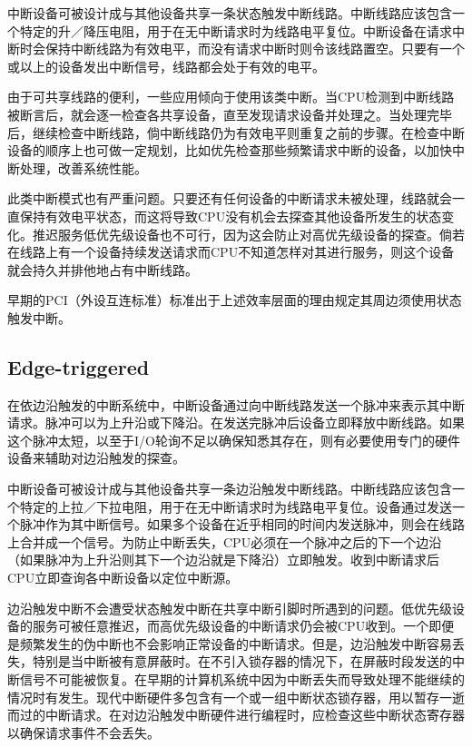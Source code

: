 中断设备可被设计成与其他设备共享一条状态触发中断线路。中断线路应该包含一个特定的升／降压电阻，用于在无中断请求时为线路电平复位。中断设备在请求中断时会保持中断线路为有效电平，而没有请求中断时则令该线路置空。只要有一个或以上的设备发出中断信号，线路都会处于有效的电平。

由于可共享线路的便利，一些应用倾向于使用该类中断。当CPU检测到中断线路被断言后，就会逐一检查各共享设备，直至发现请求设备并处理之。当处理完毕后，继续检查中断线路，倘中断线路仍为有效电平则重复之前的步骤。在检查中断设备的顺序上也可做一定规划，比如优先检查那些频繁请求中断的设备，以加快中断处理，改善系统性能。

此类中断模式也有严重问题。只要还有任何设备的中断请求未被处理，线路就会一直保持有效电平状态，而这将导致CPU没有机会去探查其他设备所发生的状态变化。推迟服务低优先级设备也不可行，因为这会防止对高优先级设备的探查。倘若在线路上有一个设备持续发送请求而CPU不知道怎样对其进行服务，则这个设备就会持久并排他地占有中断线路。

早期的PCI（外设互连标准）标准出于上述效率层面的理由规定其周边须使用状态触发中断。

\subsection{Edge-triggered}

在依边沿触发的中断系统中，中断设备通过向中断线路发送一个脉冲来表示其中断请求。脉冲可以为上升沿或下降沿。在发送完脉冲后设备立即释放中断线路。如果这个脉冲太短，以至于I/O轮询不足以确保知悉其存在，则有必要使用专门的硬件设备来辅助对边沿触发的探查。

中断设备可被设计成与其他设备共享一条边沿触发中断线路。中断线路应该包含一个特定的上拉／下拉电阻，用于在无中断请求时为线路电平复位。设备通过发送一个脉冲作为其中断信号。如果多个设备在近乎相同的时间内发送脉冲，则会在线路上合并成一个信号。为防止中断丢失，CPU必须在一个脉冲之后的下一个边沿（如果脉冲为上升沿则其下一个边沿就是下降沿）立即触发。收到中断请求后CPU立即查询各中断设备以定位中断源。

边沿触发中断不会遭受状态触发中断在共享中断引脚时所遇到的问题。低优先级设备的服务可被任意推迟，而高优先级设备的中断请求仍会被CPU收到。一个即便是频繁发生的伪中断也不会影响正常设备的中断请求。但是，边沿触发中断容易丢失，特别是当中断被有意屏蔽时。在不引入锁存器的情况下，在屏蔽时段发送的中断信号不可能被恢复。在早期的计算机系统中因为中断丢失而导致处理不能继续的情况时有发生。现代中断硬件多包含有一个或一组中断状态锁存器，用以暂存一逝而过的中断请求。在对边沿触发中断硬件进行编程时，应检查这些中断状态寄存器以确保请求事件不会丢失。

